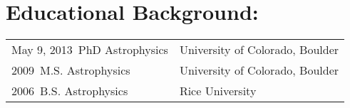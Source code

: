 \section*{Educational Background: }
\begin{tabular} {ll}
    May 9, 2013~PhD Astrophysics & University of Colorado, Boulder \\
    2009~M.S. Astrophysics & University of Colorado, Boulder \\
    2006~B.S. Astrophysics & Rice University \\
\end{tabular}

